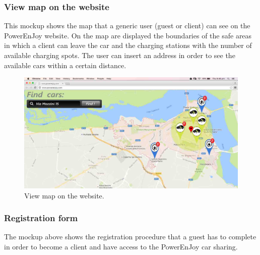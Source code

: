 \newpage

\subsubsection{View map on the website} This mockup shows the map that a generic user (guest or client) can see on the PowerEnJoy website. On the map are displayed the boundaries of the safe areas in which a client can leave the car and the charging stations with the number of available charging spots. The user can insert an address in order to see the available cars within a certain distance.
\begin{figure}[hp]
\centering
\includegraphics[width=450 pt]{resources/mappa.jpg}
\caption{\label{fig:mappa}View map on the website.}
\end{figure}

\newpage

\subsubsection{Registration form} The mockup above shows the registration procedure that a guest has to complete in order to become a client and have access to the PowerEnJoy car sharing.

